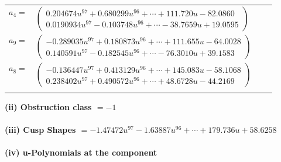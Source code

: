 \documentclass[1p]{elsarticle_modified}
\theoremstyle{definition}
\begin{document}
\begin{tabular}{m{7pt} m{180pt} m{7pt} m{180pt} }
\flushright $a_{4}=$&$\begin{pmatrix}0.204674 u^{97}+0.680299 u^{96}+\cdots+111.720 u-82.0860\\0.0190934 u^{97}-0.103748 u^{96}+\cdots-38.7659 u+19.0595\end{pmatrix}$ \\
\flushright $a_{9}=$&$\begin{pmatrix}-0.289035 u^{97}+0.180873 u^{96}+\cdots+111.655 u-64.0028\\0.140591 u^{97}-0.182545 u^{96}+\cdots-76.3010 u+39.1583\end{pmatrix}$ \\
\flushright $a_{8}=$&$\begin{pmatrix}-0.136447 u^{97}+0.413129 u^{96}+\cdots+145.083 u-58.1068\\0.238402 u^{97}+0.490572 u^{96}+\cdots+48.6728 u-44.2169\end{pmatrix}$\\&\end{tabular}
\flushleft \textbf{(ii) Obstruction class $= -1$}\\~\\
\flushleft \textbf{(iii) Cusp Shapes $= -1.47472 u^{97}-1.63887 u^{96}+\cdots+179.736 u+58.6258$}\\~\\
\newpage\renewcommand{\arraystretch}{1}
\flushleft \textbf{(iv) u-Polynomials at the component}\newline \\
\end{document}
